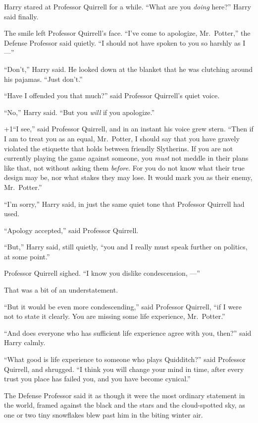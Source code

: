 Harry stared at Professor Quirrell for a while. “What are you \emph{doing} here?” Harry said finally.

The smile left Professor Quirrell’s face. “I’ve come to apologize, Mr.~Potter,” the Defense Professor said quietly. “I should not have spoken to you so harshly as I—”

“Don’t,” Harry said. He looked down at the blanket that he was clutching around his pajamas. “Just don’t.”

“Have I offended you that much?” said Professor Quirrell’s quiet voice.

“No,” Harry said. “But you \emph{will} if you apologize.”

\looseness+1“I see,” said Professor Quirrell, and in an instant his voice grew stern. “Then if I am to treat you as an equal, Mr.~Potter, I should say that you have gravely violated the etiquette that holds between friendly Slytherins. If you are not currently playing the game against someone, you \emph{must} not meddle in their plans like that, not without asking them \emph{before}. For you do not know what their true design may be, nor what stakes they may lose. It would mark you as their enemy, Mr.~Potter.”

“I’m sorry,” Harry said, in just the same quiet tone that Professor Quirrell had used.

“Apology accepted,” said Professor Quirrell.

“But,” Harry said, still quietly, “you and I really must speak further on politics, at some point.”

Professor Quirrell sighed. “I know you dislike condescension, —”

That was a bit of an understatement.

“But it would be even more condescending,” said Professor Quirrell, “if I were not to state it clearly. You are missing some life experience, Mr.~Potter.”

“And does everyone who has sufficient life experience agree with you, then?” said Harry calmly.

“What good is life experience to someone who plays Quidditch?” said Professor Quirrell, and shrugged. “I think you will change your mind in time, after every trust you place has failed you, and you have become cynical.”

The Defense Professor said it as though it were the most ordinary statement in the world, framed against the black and the stars and the cloud-spotted sky, as one or two tiny snowflakes blew past him in the biting winter air.

